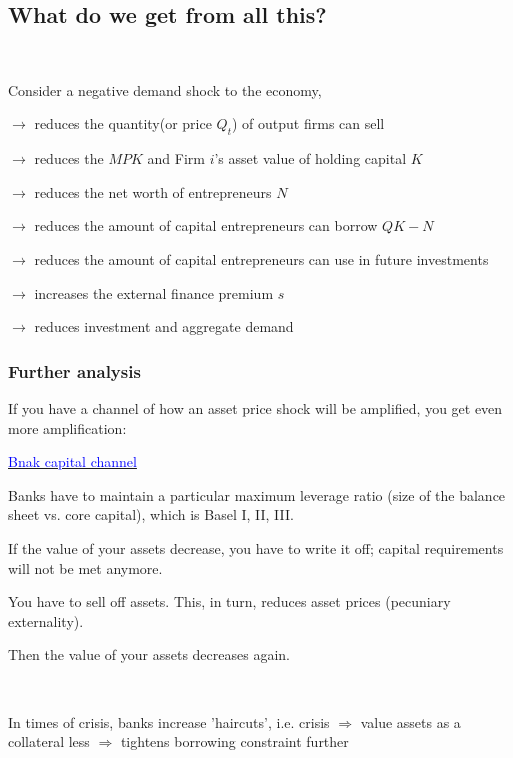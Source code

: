 \subsection{What do we get from all this?}

\begin{remark}
    \ 

    Consider a negative demand shock to the economy,

    $\rightarrow$ reduces the quantity(or price $Q_t$) of output firms can sell

    $\rightarrow$ reduces the $MPK$ and Firm $i$'s asset value of holding capital $K$
    
    $\rightarrow$ reduces the net worth of entrepreneurs $N$

    $\rightarrow$ reduces the amount of capital entrepreneurs can borrow $QK-N$

    $\rightarrow$ reduces the amount of capital entrepreneurs can use in future investments

    $\rightarrow$ increases the external finance premium $s$

    $\rightarrow$ reduces investment and aggregate demand
\end{remark}

\subsubsection{Further analysis}

If you have a channel of how an asset price shock will be amplified,
you get even more amplification:

\underline{\textcolor{blue}{Bnak capital channel}}

Banks have to maintain a particular
maximum leverage ratio (size of the balance sheet vs. core
capital), which is Basel I, II, III.

If the value of your assets decrease, you have to write it off;
capital requirements will not be met anymore.

You have to sell off assets. This, in turn, reduces asset prices
(pecuniary externality).

Then the value of your assets decreases again.

\begin{definition}
    \

    In times of crisis, banks increase 'haircuts',
    i.e. crisis $\Rightarrow$ value assets as a collateral less $\Rightarrow$ tightens borrowing
    constraint further
\end{definition}